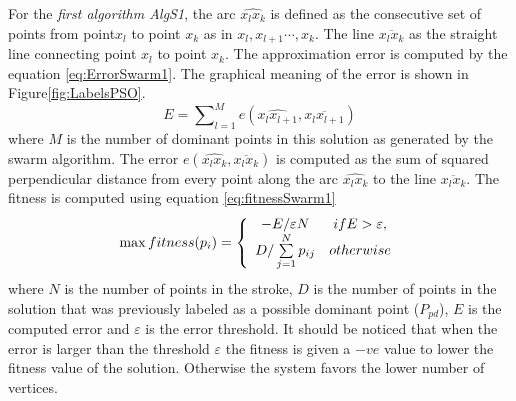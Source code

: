 \documentclass{article}
\begin{document}
For the \textit{first algorithm \textsl{AlgS1}}, 
 the arc $\widehat{x_lx_k}$ is defined as the consecutive set of points from point$x_l$ to point $x_{k}$ as in $x_l,x_{l+1} \cdots,x_k$. The line $\overline{x_l x_k} $ as the straight line connecting point $x_l$ to point $x_k$. The approximation error is computed by the equation \ref{eq:ErrorSwarm1}. The graphical meaning of the error is shown in Figure\ref{fig:LabelsPSO}.
\small\begin{equation}
E=\sum\nolimits_{l = 1}^M e ( \widehat{x_lx_{l+1}},\overline{x_l x_{l+1}})
\label{eq:ErrorSwarm1}
\end{equation} 
\normalsize
where $M$ is the number of dominant points in this solution as generated by the swarm algorithm. The error $e ( \widehat{x_lx_k},\overline{x_l x_k})$ is computed as the sum of squared perpendicular distance from every point along the arc $\widehat{x_lx_k}$ to the line $\overline{x_l x_k}$. The fitness is computed using equation \ref{eq:fitnessSwarm1}
\small \begin{equation}
\max fitness(p_i ) = \left\{ {\begin{array}{*{20}c}
   { - E/\varepsilon N} & {ifE > \varepsilon ,}  \\
   {D/\sum\limits_{j = 1}^N {p_{ij} } } & {otherwise}  \\
\end{array}} \right.
\label{eq:fitnessSwarm1}
\end{equation}\normalsize where $N$ is the number of points in the stroke, $D$ is the number of points in the solution that was previously labeled as a possible dominant point ($P_{pd}$), $E$ is the computed error and $\varepsilon$ is the error threshold. It should be noticed that when the error is larger than the threshold $\varepsilon$ the fitness is given a $-ve$ value to lower the fitness value of the solution. Otherwise the system favors the lower number of vertices.
\end{document}
